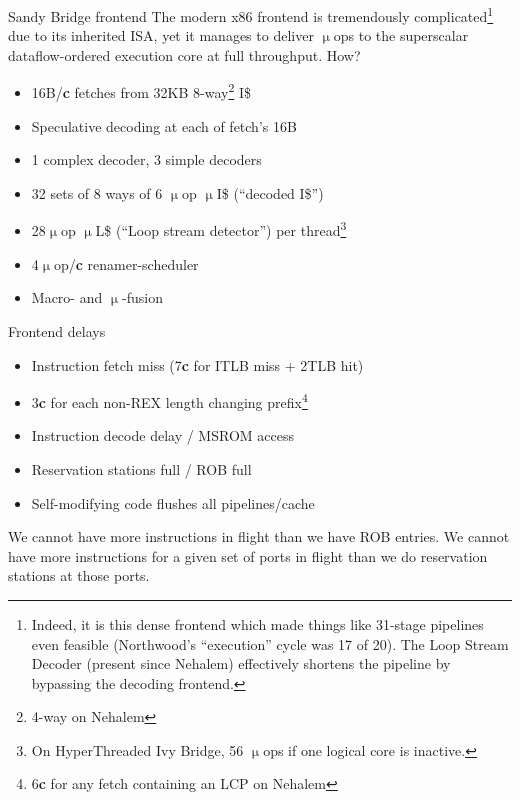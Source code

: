 \documentclass[mathserif,xcolor={dvipsnames,table}]{beamer}
\begin{document}
\begin{frame}{Sandy Bridge frontend}
The modern x86 frontend is tremendously complicated\footnote{\tiny{Indeed, it is
this dense frontend which made things like 31-stage pipelines even feasible (Northwood's
``execution'' cycle was 17 of 20). The
Loop Stream Decoder (present since Nehalem) effectively shortens the pipeline by
bypassing the decoding frontend.}} due to its inherited ISA,
yet it manages to deliver $\upmu$ops to the superscalar dataflow-ordered
execution core at full throughput. How?
\vfill
\begin{itemize}
\item 16B/\textbf{c} fetches from 32KB 8-way\footnote{\tiny{4-way on Nehalem}} I\$
\item Speculative decoding at each of fetch's 16B
\item 1 complex decoder, 3 simple decoders
\item 32 sets of 8 ways of 6 $\upmu$op $\upmu$I\$ (``decoded I\$'')
\item 28$\upmu$op $\upmu$L\$ (``Loop stream detector'') per thread\footnote{\tiny{On HyperThreaded Ivy Bridge, 56 $\upmu$ops if one logical core is inactive.}}
\item 4$\upmu$op/\textbf{c} renamer-scheduler
\item Macro- and $\upmu$-fusion
\end{itemize}
\end{frame}

\begin{frame}{Frontend delays}
\begin{itemize}
\item Instruction fetch miss (7\textbf{c} for ITLB miss + 2TLB hit)
\item 3\textbf{c} for each non-REX length changing prefix\footnote{6\textbf{c} for any fetch containing an LCP on Nehalem}
\item Instruction decode delay / MSROM access
\item Reservation stations full / ROB full
\item Self-modifying code flushes all pipelines/cache
\end{itemize}
\vfill
We cannot have more instructions in flight than we have ROB entries. We cannot
have more instructions for a given set of ports in flight than we do
reservation stations at those ports.
\end{frame}
\end{document}
